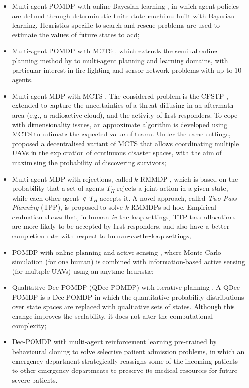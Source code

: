 \begin{itemize}
    \item Multi-agent POMDP with online Bayesian learning \cite{allen2010}, in which agent
        policies are defined through deterministic finite state machines built with
        Bayesian learning. Heuristics specific to search and rescue problems are used to
        estimate the values of future states to add;
    \item Multi-agent POMDP with MCTS \cite{amato2015}, which extends the seminal online
        planning method by \cite{silver2010} to multi-agent planning and learning
        domains, with particular interest in fire-fighting and sensor network problems
        with up to $10$ agents.
    \item Multi-agent MDP with MCTS \cite{ramchurn2015a}. The considered problem is the
        CFSTP \cite{ramchurn2010cfstp}, extended to capture the uncertainties of a threat
        diffusing in an aftermath area (e.g., a radioactive cloud), and the activity of
        first responders. To cope with dimensionality issues, an approximate algorithm is
        developed using MCTS to estimate the expected value of teams. Under the same
        settings, \cite{baker2016} proposed a decentralised variant of MCTS that allows
        coordinating multiple UAVs in the exploration of continuous disaster spaces, with
        the aim of maximising the probability of discovering survivors;
    \item Multi-agent MDP with rejections, called $k$-RMMDP \cite{ramchurn2016}, which
        is based on the probability that a set of agents $T_H$ rejects a joint action in a
        given state, while each other agent $\notin T_H$ accepts it. A novel approach,
        called \emph{Two-Pass Planning} (TPP), is proposed to solve $k$-RMMDPs ad hoc.
        Empirical evaluation shows that, in human-\emph{in}-the-loop settings, TTP task
        allocations are more likely to be accepted by first responders, and also have a
        better completion rate with respect to human-\emph{on}-the-loop settings;
    \item POMDP with online planning and active sensing \cite{wu2016}, where Monte Carlo
        simulation (for one human) is combined with information-based active sensing (for
        multiple UAVs) using an anytime heuristic;
    \item Qualitative Dec-POMDP (QDec-POMDP) with iterative planning \cite{bazinin2018}.
        A QDec-POMDP is a Dec-POMDP in which the quantitative probability distributions
        over state spaces are replaced with qualitative sets of states. Although this
        change improves the scalability, it does not alter the computational complexity;
    \item Dec-POMDP with multi-agent reinforcement learning \cite{lee2021} pre-trained by
        behavioural cloning \cite{lee2021} to solve selective patient admission
        problems, in which an emergency department strategically reassigns some of the
        incoming patients to other emergency departments to preserve its medical resources
        for future severe patients.
\end{itemize}
